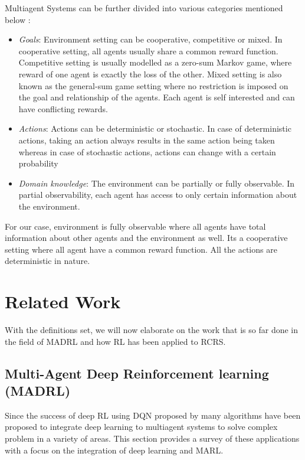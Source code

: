 \documentclass[12pt]{report}
\begin{document}
Multiagent Systems can be further divided into various categories mentioned below \cite{SurveyandArticle}:

\begin{itemize}
    \item \emph{Goals}: Environment setting can be cooperative, competitive or mixed. In cooperative setting, all agents usually share a common reward function. Competitive setting is usually modelled as a zero-sum Markov game, where reward of one agent is exactly the loss of the other. Mixed setting is also known as the general-sum game setting where no restriction is imposed on the goal and relationship of the agents. Each agent is self interested and can have conflicting rewards.
    \item \emph{Actions}: Actions can be deterministic or stochastic. In case of deterministic actions, taking an action always results in the same action being taken whereas in case of stochastic actions, actions can change with a certain probability
    \item \emph{Domain knowledge}: The environment can be partially or fully observable. In partial observability, each agent has access to only certain information about the environment. 
\end{itemize}

For our case, environment is fully observable where all agents have total information about other agents and the environment as well. Its a cooperative setting where all agent have a common reward function. All the actions are deterministic in nature. 

\chapter{Related Work}

With the definitions set, we will now elaborate on the work that is so far done in the field of MADRL and how RL has been applied to RCRS.

\section{Multi-Agent Deep Reinforcement learning (MADRL)}

Since the success of deep RL using DQN proposed by \cite{Kavukcuoglu} many algorithms have been proposed to integrate deep learning to multiagent systems to solve complex problem in a variety of areas. This section provides a survey of these applications with a focus on the integration of deep learning and MARL. 
\end{document}
